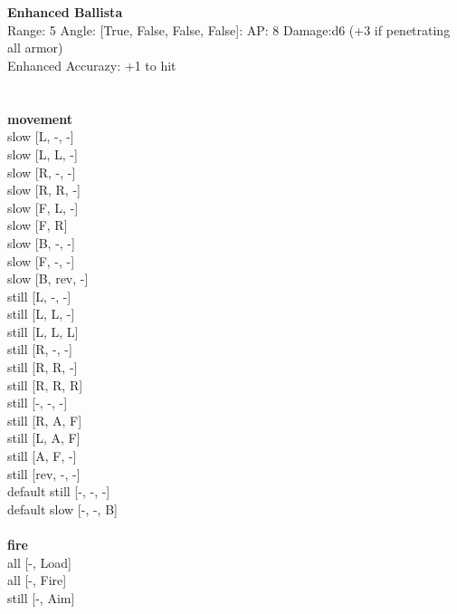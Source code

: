\ \\

\ \\
{\bf Enhanced Ballista } \\



Range: 5  Angle: [True, False, False, False]: AP: 8 Damage:d6 (+3 if penetrating all armor) \\
Enhanced Accurazy: +1 to hit\\ 




 
\ \\



\ \\ {\bf movement } \\
slow [L, -, -] \\
slow [L, L, -] \\
slow [R, -, -] \\
slow [R, R, -] \\
slow [F, L, -] \\
slow [F, R] \\
slow [B, -, -] \\
slow [F, -, -] \\
slow [B, rev, -] \\
still [L, -, -] \\
still [L, L, -] \\
still [L, L, L] \\
still [R, -, -] \\
still [R, R, -] \\
still [R, R, R] \\
still [-, -, -] \\
still [R, A, F] \\
still [L, A, F] \\
still [A, F, -] \\
still [rev, -, -] \\
default still [-, -, -] \\
default slow [-, -, B] \\
\ \\ {\bf fire } \\
all [-, Load] \\
all [-, Fire] \\
still [-, Aim] \\



